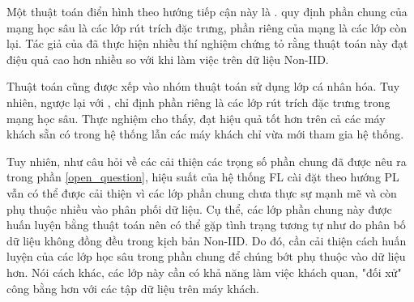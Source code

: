 Một thuật toán điển hình theo hướng tiếp cận này là  \cite{arivazhagan2019federated}.  quy định phần chung của mạng học sâu là các lớp rút trích đặc trưng, phần riêng của mạng là các lớp còn lại. Tác giả của  đã thực hiện nhiều thí nghiệm chứng tỏ rằng thuật toán này đạt điệu quả cao hơn nhiều so với  khi làm việc trên dữ liệu Non-IID.

Thuật toán  \cite{liang2020think} cũng được xếp vào nhóm thuật toán sử dụng lớp cá nhân hóa. Tuy nhiên, ngược lại với ,  chỉ định phần riêng là các lớp rút trích đặc trưng trong mạng học sâu. Thực nghiệm cho thấy,  đạt hiệu quả tốt hơn  trên cả các máy khách sẵn có trong hệ thống lẫn các máy khách chỉ vừa mới tham gia hệ thống.

Tuy nhiên, như câu hỏi về các cải thiện các trọng số phần chung đã được nêu ra trong phần \ref{open_question}, hiệu suất của hệ thống FL cài đặt theo hướng PL vẫn có thể được cải thiện vì các lớp phần chung chưa thực sự mạnh mẽ và còn phụ thuộc nhiều vào phân phối dữ liệu. Cụ thể, các lớp phần chung này được huấn luyện bằng thuật toán  nên có thể gặp tình trạng tương tự như  do phân bố dữ liệu không đồng đều trong kịch bản Non-IID. Do đó, cần cải thiện cách huấn luyện của các lớp học sâu trong phần chung để chúng bớt phụ thuộc vào dữ liệu hơn. Nói cách khác, các lớp này cần có khả năng làm việc khách quan, "đối xử" công bằng hơn với các tập dữ liệu trên máy khách.


